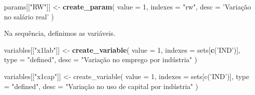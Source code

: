 \documentclass[12pt,twoside]{article}
\newenvironment{Shaded}{\begin{snugshade}}{\end{snugshade}}
\newcommand{\DataTypeTok}[1]{\textcolor[rgb]{0.13,0.29,0.53}{#1}}
\newcommand{\DecValTok}[1]{\textcolor[rgb]{0.00,0.00,0.81}{#1}}
\newcommand{\KeywordTok}[1]{\textcolor[rgb]{0.13,0.29,0.53}{\textbf{#1}}}
\newcommand{\NormalTok}[1]{#1}
\newcommand{\OperatorTok}[1]{\textcolor[rgb]{0.81,0.36,0.00}{\textbf{#1}}}
\newcommand{\StringTok}[1]{\textcolor[rgb]{0.31,0.60,0.02}{#1}}
\let\oldShaded\Shaded
\let\endoldShaded\endShaded
\renewenvironment{Shaded}{\footnotesize\oldShaded}{\endoldShaded}
\begin{document}
\begin{Shaded}
\end{Shaded}

\begin{Shaded}
\begin{Highlighting}[]
\NormalTok{params[[}\StringTok{"RW"}\NormalTok{]] <-}\StringTok{ }\KeywordTok{create_param}\NormalTok{(}
  \DataTypeTok{value =} \DecValTok{1}\NormalTok{,}
  \DataTypeTok{indexes =} \StringTok{"rw"}\NormalTok{,}
  \DataTypeTok{desc =} \StringTok{'Variação no salário real'}
\NormalTok{)}
\end{Highlighting}
\end{Shaded}

Na sequência, definimos as variáveis.

\begin{Shaded}
\begin{Highlighting}[]
\NormalTok{variables[[}\StringTok{"x1lab"}\NormalTok{]] <-}\StringTok{ }\KeywordTok{create_variable}\NormalTok{(}
  \DataTypeTok{value =} \DecValTok{1}\NormalTok{,}
  \DataTypeTok{indexes =}\NormalTok{ sets[}\KeywordTok{c}\NormalTok{(}\StringTok{'IND'}\NormalTok{)],}
  \DataTypeTok{type =} \StringTok{"defined"}\NormalTok{,}
  \DataTypeTok{desc =} \StringTok{"Variação no emprego por indústria"}
\StringTok{)}

\StringTok{variables[["}\NormalTok{x1cap}\StringTok{"]] <- create_variable(}
\StringTok{  value = 1,}
\StringTok{  indexes = sets[c('IND')],}
\StringTok{  type = "}\NormalTok{defined}\StringTok{",}
\StringTok{  desc = "}\NormalTok{Variação no uso de capital por indústria"}
\NormalTok{)}
\end{Highlighting}
\end{Shaded}
\end{document}
